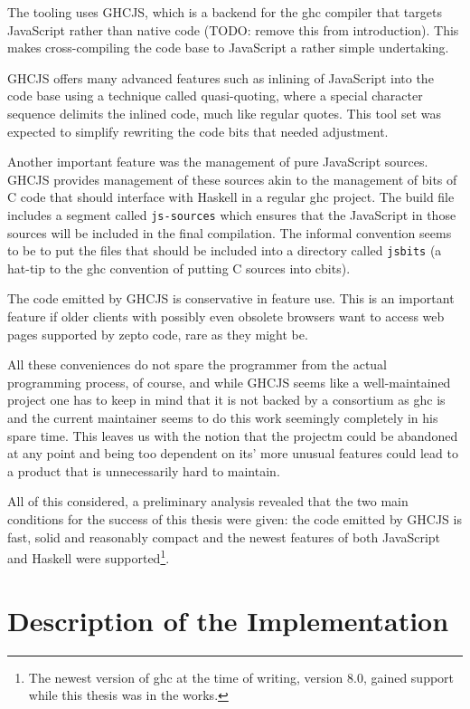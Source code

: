 \documentclass[oneside,11pt,xetex]{scrbook}
\begin{document}
The tooling uses GHCJS, which is a backend for the \gls{ghc} compiler that targets JavaScript rather
than native code (TODO: remove this from introduction). This makes cross-compiling the code base to
JavaScript a rather simple undertaking.

GHCJS offers many advanced features such as inlining of JavaScript into the code
base using a technique called quasi-quoting, where a special character sequence delimits the
inlined code, much like regular quotes. This tool set was expected to simplify rewriting the code
bits that needed adjustment.

Another important feature was the management of pure JavaScript sources. GHCJS provides management
of these sources akin to the management of bits of C code that should interface with Haskell in a
regular \gls{ghc} project. The build file includes a segment called \texttt{js-sources} which ensures
that the JavaScript in those sources will be included in the final compilation. The informal convention
seems to be to put the files that should be included into a directory called \texttt{jsbits} (a hat-tip
to the \gls{ghc} convention of putting C sources into cbits).

The code emitted by GHCJS is conservative in feature use. This is an important feature if older clients
with possibly even obsolete browsers want to access web pages supported by zepto code, rare as they might
be.

All these conveniences do not spare the programmer from the actual programming process, of course,
and while GHCJS seems like a well-maintained project one has to keep in mind that it is not backed
by a consortium as \gls{ghc} is and the current maintainer seems to do this work seemingly completely
in his spare time. This leaves us with the notion that the projectm could be abandoned at any point
and being too dependent on its' more unusual features could lead to a product that is unnecessarily
hard to maintain.

All of this considered, a preliminary analysis revealed that the two main conditions for the success
of this thesis were given: the code emitted by GHCJS is fast, solid and reasonably compact and the
newest features of both JavaScript and Haskell were supported\footnote{The newest version of \gls{ghc}
at the time of writing, version 8.0, gained support while this thesis was in the works.}.

\section{Description of the Implementation}
\end{document}
